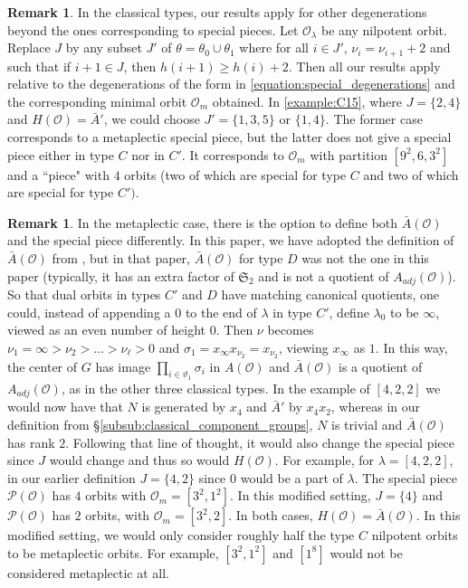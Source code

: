 \documentclass{amsart}
\theoremstyle{definition}
\newtheorem{remark}[theorem]{Remark}
\newcommand{\cP}{\mathcal{P}}
\newcommand{\frakS}{\mathfrak{S}}
\newcommand{\Ab}{\bar{A}}
\newcommand{\0}{\mathcal{O}}
\begin{document}
\begin{remark}
In the classical types, our results apply for other degenerations beyond the ones corresponding to special pieces.  Let $\0_\lambda$ be any nilpotent orbit.  Replace $J$ by 
any subset $J'$ of $\theta = \theta_0 \cup \theta_1$ where
for all $i \in J'$, $\nu_i =\nu_{i+1}+2$ and such that if $i+1\in J$, then $h(i+1) \geq h(i)+2$.  Then all our results apply relative to the degenerations of the form in \eqref{equation:special_degenerations} and the corresponding minimal orbit $\0_m$ obtained.   In \cref{example:C15},
where $J = \{2,4\}$ and $H(\0) = \bar A'$, we could choose 
$J' = \{1,3,5\}$ or $\{1, 4\}$.  The former case corresponds to a metaplectic special piece, but the latter does not give a special piece either in type $C$ nor in $C'$.  It corresponds 
to $\0_m$ with partition $[9^2,6,3^2]$ and a ``piece" with $4$ orbits (two of which are special for type $C$ and two of which are special
for type $C')$.
\end{remark}


\begin{remark}\label{remark:meta_different_specials}
In the metaplectic case, there is the option to define both $\bar{A}(\0)$ and the special piece differently.  In this paper, we have adopted the definition 
of $\Ab(\0)$ from \cite{JLS:Duality}, but in that paper, $\bar{A}(\0)$ for type $D$ was not the one in this paper (typically, it has an extra factor of $\frakS_2$ and is not a quotient of $A_{adj}(\0)$).  So that dual orbits in types $C'$ and $D$ have matching canonical quotients, one could, instead of appending a $0$ to the end of $\lambda$ in type $C'$, define $\lambda_0$ to be $\infty$, viewed as an even number of height $0$.  Then $\nu$ becomes $\nu_1 = \infty > \nu_2 > \dots > \nu_{\ell} >0$ and $\sigma_1 = x_\infty x_{\nu_2} = x_{\nu_2}$, viewing $x_{\infty}$ as $1$.  In this way, the center of $G$ has image
$\prod_{i \in \vartheta_1} \sigma_i$ in $A(\0)$
and $\Ab(\0)$ is a quotient of $A_{adj}(\0)$, as in the other three classical types.  In the example of $[4,2,2]$ we would now have that $N$ is generated by $x_4$ and $\Ab'$ by $x_4x_2$, whereas in our definition 
from \S\ref{subsub:classical_component_groups}, $N$ is trivial and 
$\Ab(\0)$ has rank $2$.
 Following that line of thought, it would also change the special piece since $J$ would change and thus so would $H(\0)$.  For example, for $\lambda = [4,2,2]$, in our earlier definition $J = \{4,2\}$ since $0$ would be a part of $\lambda$.  The special piece $\cP(\0)$ has $4$ orbits with $\0_m = [3^2,1^2]$.  In this modified setting, $J = \{4\}$ and $\cP(\0)$ has $2$ orbits, with $\0_m = [3^2,2]$.  In both cases, $H(\0)=\Ab(\0)$.  
In this modified setting, we would only consider roughly half the type $C$ nilpotent orbits to be metaplectic orbits.  For example, $[3^2, 1^2]$  and $[1^8]$ would not be considered metaplectic at all.
\end{remark}
\end{document}
